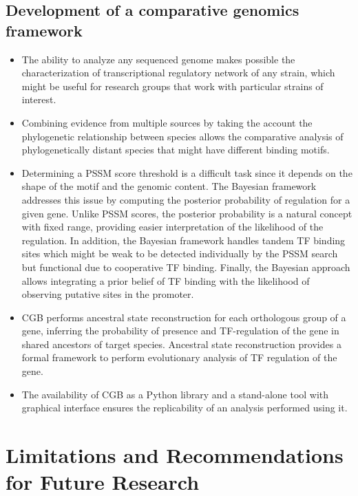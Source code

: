 \subsection{Development of a comparative genomics framework}

\begin{itemize}

\item The ability to analyze any sequenced genome makes possible the
  characterization of transcriptional regulatory network of any strain, which
  might be useful for research groups that work with particular strains of
  interest.

\item Combining evidence from multiple sources by taking the account the
  phylogenetic relationship between species allows the comparative analysis of
  phylogenetically distant species that might have different binding motifs.

\item Determining a PSSM score threshold is a difficult task since it depends
  on the shape of the motif and the genomic content. The Bayesian framework
  addresses this issue by computing the posterior probability of regulation for
  a given gene. Unlike PSSM scores, the posterior probability is a natural
  concept with fixed range, providing easier interpretation of the likelihood
  of the regulation. In addition, the Bayesian framework handles tandem TF
  binding sites which might be weak to be detected individually by the PSSM
  search but functional due to cooperative TF binding. Finally, the Bayesian
  approach allows integrating a prior belief of TF binding with the likelihood
  of observing putative sites in the promoter.

\item CGB performs ancestral state reconstruction for each orthologous group of
  a gene, inferring the probability of presence and TF-regulation of the gene
  in shared ancestors of target species. Ancestral state reconstruction
  provides a formal framework to perform evolutionary analysis of TF regulation
  of the gene.

\item The availability of CGB as a Python library and a stand-alone tool with
  graphical interface ensures the replicability of an analysis performed using
  it.
\end{itemize}

\section{Limitations and Recommendations for Future Research}

